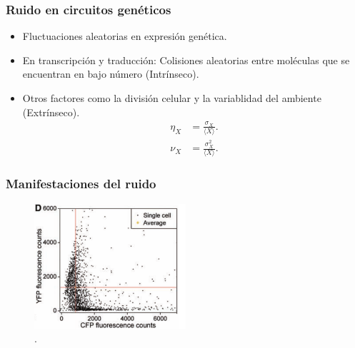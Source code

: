 \documentclass[10pt]{beamer}
\begin{document}
\begin{frame}
\frametitle{Ruido en circuitos gen\'eticos}
\begin{itemize}
\item Fluctuaciones aleatorias en expresi\'on gen\'etica.
\item En transcripci\'on y traducci\'on: Colisiones aleatorias entre mol\'eculas que se encuentran en bajo n\'umero (Intr\'inseco).
\item Otros factores como la divisi\'on celular y la variablidad del ambiente (Extr\'inseco).
\begin{align*}
\eta_X &= \frac{\sigma_X}{\langle X \rangle}.\\[1.5ex]
\nu_X &= \frac{\sigma^2_X}{\langle X \rangle}.
\end{align*}
\end{itemize}
\end{frame}


\begin{frame}
\frametitle{Manifestaciones del ruido}
\begin{figure}[p]
    \centering
    \includegraphics[width=0.5\textwidth]{noiseGFP.png}\\
    \tiny \cite{pedraza05}.
\end{figure}
\end{frame}
\end{document}
